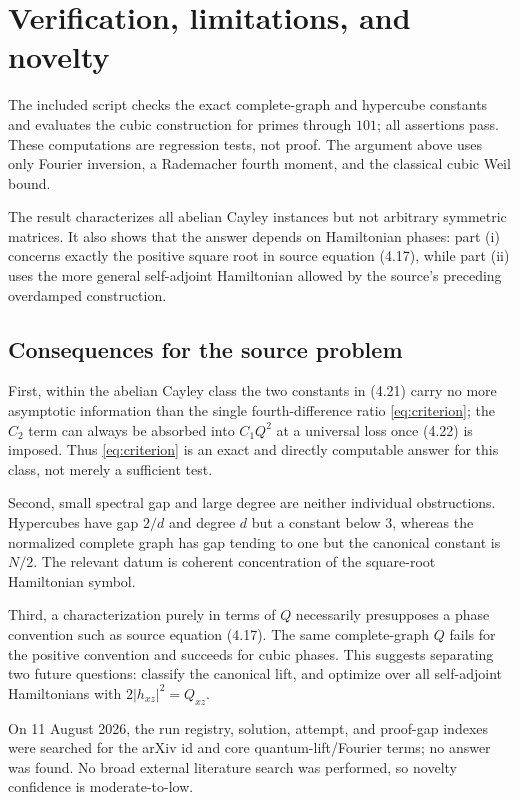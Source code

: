 \documentclass[10pt]{article}
\begin{document}
\newpage
\section*{Verification, limitations, and novelty}

The included script checks the exact complete-graph and hypercube constants
and evaluates the cubic construction for primes through $101$; all assertions
pass.  These computations are regression tests, not proof.  The argument above
uses only Fourier inversion, a Rademacher fourth moment, and the classical
cubic Weil bound.

The result characterizes all abelian Cayley instances but not arbitrary
symmetric matrices.  It also shows that the answer depends on Hamiltonian
phases: part (i) concerns exactly the positive square root in source equation
(4.17), while part (ii) uses the more general self-adjoint Hamiltonian allowed
by the source's preceding overdamped construction.

\subsection*{Consequences for the source problem}

First, within the abelian Cayley class the two constants in (4.21) carry no
more asymptotic information than the single fourth-difference ratio
\eqref{eq:criterion}; the $C_2$ term can always be absorbed into $C_1Q^2$ at a
universal loss once (4.22) is imposed.  Thus \eqref{eq:criterion} is an exact
and directly computable answer for this class, not merely a sufficient test.

Second, small spectral gap and large degree are neither individual
obstructions.  Hypercubes have gap $2/d$ and degree $d$ but a constant below
$3$, whereas the normalized complete graph has gap tending to one but the
canonical constant is $N/2$.  The relevant datum is coherent concentration of
the square-root Hamiltonian symbol.

Third, a characterization purely in terms of $Q$ necessarily presupposes a
phase convention such as source equation (4.17).  The same complete-graph
$Q$ fails for the positive convention and succeeds for cubic phases.  This
suggests separating two future questions: classify the canonical lift, and
optimize over all self-adjoint Hamiltonians with $2|h_{xz}|^2=Q_{xz}$.

On 11 August 2026, the run registry, solution, attempt, and proof-gap indexes
were searched for the arXiv id and core quantum-lift/Fourier terms; no answer
was found.  No broad external literature search was performed, so novelty
confidence is moderate-to-low.
\end{document}
